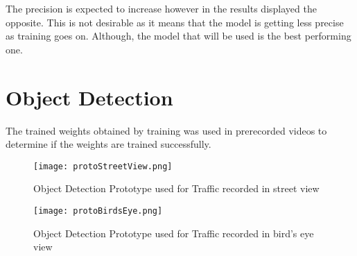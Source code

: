 The precision is expected to increase however in the results displayed the opposite. This is not desirable as it means that the model is getting less precise as training goes on. Although, the model that will be used is the best performing one.

\section{Object Detection}

The trained weights obtained by training was used in prerecorded videos to determine if the weights are trained successfully.

\begin{figure}[h!]
	\texttt{[image: protoStreetView.png]}
	\caption{Object Detection Prototype used for Traffic recorded in street view}
	\label{fig:protoStreetView}
\end{figure}

\begin{figure}[h!]
	\texttt{[image: protoBirdsEye.png]}
	\caption{Object Detection Prototype used for Traffic recorded in bird's eye view}
	\label{fig:protoBirdsEye}
\end{figure}


